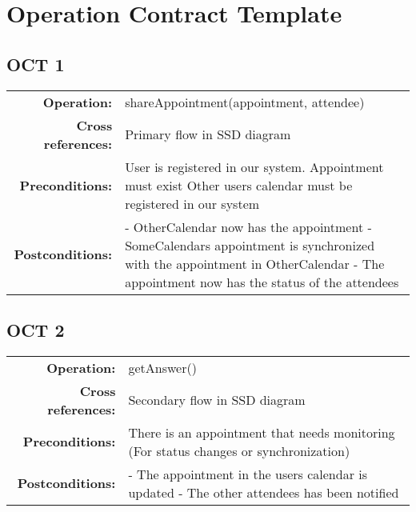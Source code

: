 \section{Operation Contract Template}
  \subsection{OCT 1}
    \begin{table*}[ht]\centering
      \begin{tabularx}{\textwidth}{@{}|rX|@{}}\hline
        \textbf{Operation:}        & shareAppointment(appointment, attendee) \\
        \textbf{Cross references:} & Primary flow in SSD diagram\\
        \textbf{Preconditions:}    & User is registered in our system.\newline
                                     Appointment must exist\newline
                                     Other users calendar must be registered in our system \\
        \textbf{Postconditions:}   & - OtherCalendar now has the appointment \newline
                                     - SomeCalendars appointment is synchronized with the appointment in OtherCalendar \newline
                                     - The appointment now has the status of the attendees \\\hline
      \end{tabularx}
    \end{table*}
  \subsection{OCT 2}
    \begin{table*}[ht]\centering
      \begin{tabularx}{\textwidth}{@{}|rX|@{}}\hline
        \textbf{Operation:}        & getAnswer()\\
        \textbf{Cross references:} & Secondary flow in SSD diagram \\
        \textbf{Preconditions:}    & There is an appointment that needs monitoring \newline
                                     (For status changes or synchronization)\\
        \textbf{Postconditions:}   & - The appointment in the users calendar is updated \newline 
                                     - The other attendees has been notified \\\hline
      \end{tabularx}
    \end{table*}
\newpage
